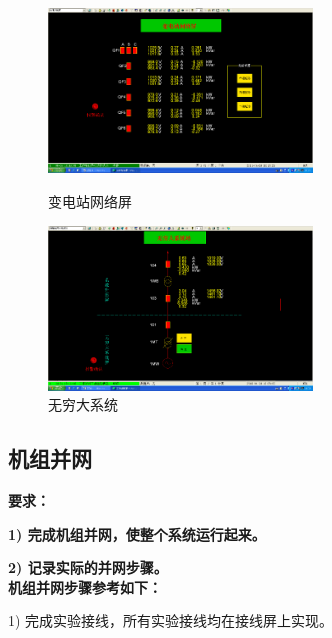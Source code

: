 \documentclass[a4paper]{ctexrep}
\begin{document}
                    \begin{figure}[htbp]
                        \centering
                        \begin{minipage}[t]{0.48\textwidth}
                            \centering
                            \includegraphics[width=7cm]{13.png}
                            \caption{变电站网络屏}
                        \end{minipage} 
                        \begin{minipage}[t]{0.48\textwidth}
                            \centering
                            \includegraphics[width=7cm]{14.png}
                            \caption{无穷大系统}
                        \end{minipage}
                    \end{figure}
                
                \newpage

                \subsection{机组并网}
                    \textbf{要求：}

                    \textbf{1) 完成机组并网，使整个系统运行起来。}

                    \textbf{2) 记录实际的并网步骤。} \\

                    \textbf{机组并网步骤参考如下：} 
                    
                    1) 完成实验接线，所有实验接线均在接线屏上实现。
                    
\end{document}
